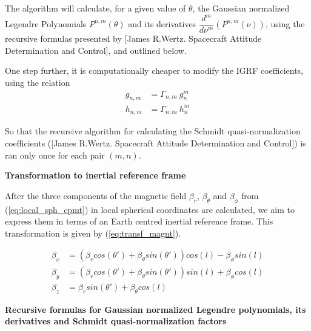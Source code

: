 The algorithm will calculate, for a given value of $\theta$, the Gaussian normalized Legendre Polynomials $P^{n,m}(\theta)$ and its derivatives $\dfrac{d^m}{d\nu^m}(P^{n,m}(\nu))$, using the recursive formulas presented by [James R.Wertz. Spacecraft Attitude Determination and Control], and outlined below.

One step further, it is computationally cheaper to modify the IGRF coefficients, using the relation
\begin{equation}
\begin{aligned}
g_{n,m} &= \Gamma_{n,m}\ g_n^m \\ h_{n,m} &= \Gamma_{n,m}\  h_n^m
\end{aligned}
\end{equation}

So that the recursive algorithm for calculating the Schmidt quasi-normalization coefficients ([James R.Wertz. Spacecraft Attitude Determination and Control]) is ran only once for each pair $(m,n)$.

\textbf{Transformation to inertial reference frame}

After the three components of the magnetic field $\beta_r$, $\beta_{\theta}$ and $\beta_{\phi}$ from (\ref{eq:local_sph_cpmt}) in local spherical coordinates are calculated, we aim to express them in terms of an Earth centred inertial reference frame. This transformation is given by (\ref{eq:transf_magnt}). %

\begin{equation}
\begin{aligned} \label{eq:transf_magnt}
\beta_x &= \left(\beta_r cos(\theta') +  \beta_{\theta}sin(\theta')\right)cos(l) - \beta_{\phi}sin(l)\\
\beta_y &= \left(\beta_r cos(\theta') +  \beta_{\theta}sin(\theta')\right)sin(l) + \beta_{\phi}cos(l)\\
\beta_z &= \beta_r sin(\theta') + \beta_{\theta} cos(l)
\end{aligned}
\end{equation}


{\bf Recursive formulas for Gaussian normalized Legendre polynomials, its derivatives and Schmidt quasi-normalization factors}

